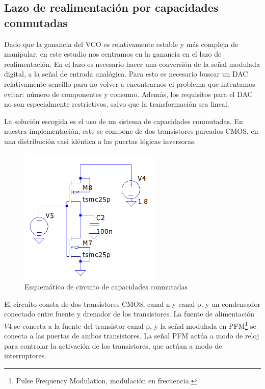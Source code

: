 \documentclass[12pt]{report} %
\begin{document}
	\subsection{Lazo de realimentación por capacidades conmutadas}
	
	Dado que la ganancia del VCO es relativamente estable y más compleja de manipular, en este estudio nos centramos en la ganancia en el lazo de realimentación. En el lazo es necesario hacer una conversión de la señal modulada digital, a la señal de entrada analógica. Para esto es necesario buscar un DAC relativamente sencillo para no volver a encontrarnos el problema que intentamos evitar: número de componentes y consumo. Además, los requisitos para el DAC no son especialmente restrictivos, salvo que la transformación sea lineal.
	
	
	La solución escogida es el uso de un sistema de capacidades conmutadas. En nuestra implementación, este se compone de dos transistores pareados CMOS, en una distribución casi idéntica a las puertas lógicas inversoras.
	
	\begin{figure}[H]
		\includegraphics[width=0.6\textwidth]{sw-capacities-sch.png}
		\caption[Esquemático de circuito de capacidades conmutadas]{Esquemático de circuito de capacidades conmutadas}
		\label{fig:sw-capacities-sch.png}
	\end{figure}
	
	El circuito consta de dos transistores CMOS, canal-n y canal-p, y un condensador conectado entre fuente y drenador de los transistores. La fuente de alimentación $V4$ se conecta a la fuente del transistor canal-p, y la señal modulada en PFM\footnote{Pulse Frequency Modulation, modulación en frecuencia.} se conecta a las puertas de ambos transistores. La señal PFM actúa a modo de reloj para controlar la activación de los transistores, que actúan a modo de interruptores.
	
\end{document}
